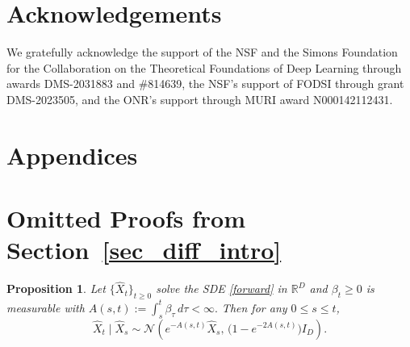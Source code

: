 \documentclass[12pts]{article}
\newtheorem{propos}[defn]{Proposition}
\newcommand{\hX}{ \widehat{X}}
\begin{document}
\section*{Acknowledgements}
We gratefully acknowledge the support of the NSF and the Simons Foundation for the Collaboration on the Theoretical Foundations of Deep Learning through awards DMS-2031883 and \#814639, the NSF's support of FODSI through grant DMS-2023505, and the ONR's support through MURI award N000142112431. 
\appendix
\section*{Appendices}
\startcontents[sections]
\section{Omitted Proofs from Section~\ref{sec_diff_intro}}
\begin{propos}\label{prop_forward_conditional}
Let $\{\hX_t\}_{t\ge 0}$ solve the SDE \eqref{forward} in $\mathbb R^D$ and
$\beta_t \ge 0$ is measurable with
$A(s,t) := \int_s^t \beta_\tau\,d\tau < \infty.$
Then for any $0 \le s \le t$,
\[
\widehat X_t \mid \widehat X_s
\sim
\mathcal N\!\left(
e^{-A(s,t)} \widehat X_s,\,
\big(1-e^{-2A(s,t)}\big) I_D
\right).
\]
\end{propos}
\end{document}
